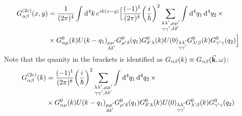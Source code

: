 \documentclass[11pt, a4paper, twoside, openright]{article}
\begin{document}
\begin{equation*}
\begin{split}
  G_{\alpha \beta }^{(2c)} (x,y) &= \frac{1}{(2 \pi )^4} \int_{}^{} \dd[4]{k} e^{i k (x-y)}
  \Big[ \frac{(-1)^1}{(2 \pi )^{8}} \qty(\frac{i}{\hbar })^2
   \sum_{\substack{\lambda \lambda', \mu \mu' \\ \gamma \gamma', \delta \delta'   } }^{}  \int_{}^{} \dd[4]{q_1} \dd[4]{q_2}   \times \\
   &
   \times G^0_{\alpha \mu } (k) U (k-q_1)_{\substack{ \mu \mu' \\ \delta \delta'} } G^0_{\mu' \delta } (q_1) G^0_{\delta' \lambda  } (k) U (0)_{\substack{ \lambda \lambda' \\ \gamma \gamma'} } G^0_{\lambda' \beta  } (k) G^0_{\gamma' \gamma  } (q_2) \Big]
\end{split}
\end{equation*}
Note that the quanity in the brackets is identified as \( G_{\alpha \beta } (k) \equiv G_{\alpha \beta } (\va{k}, \omega) \):
\begin{equation}
\begin{split}
  G_{\alpha \beta }^{(2c)} (k) &=  \frac{(-1)^1}{(2 \pi )^{8}} \qty(\frac{i}{\hbar })^2
   \sum_{\substack{\lambda \lambda', \mu \mu' \\ \gamma \gamma', \delta \delta'   } }^{}  \int_{}^{} \dd[4]{q_1} \dd[4]{q_2}   \times \\
   &
   \times G^0_{\alpha \mu } (k) U (k-q_1)_{\substack{ \mu \mu' \\ \delta \delta'} } G^0_{\mu' \delta } (q_1) G^0_{\delta' \lambda  } (k) U (0)_{\substack{ \lambda \lambda' \\ \gamma \gamma'} } G^0_{\lambda' \beta  } (k) G^0_{\gamma' \gamma  } (q_2)
\end{split}
\label{eq:c_analitic_momentum}
\end{equation}
\end{document}
